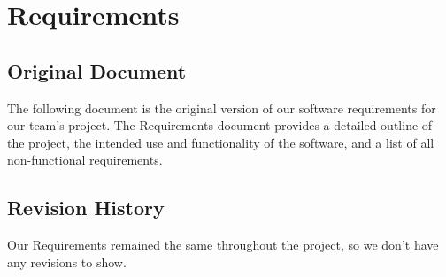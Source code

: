 \documentclass[10pt,letterpaper,onecolumn,draftclsnofoot,journal]{IEEEtran}
\begin{document}
\section{\textbf{Requirements}}
\subsection{\textbf{Original Document}}
The following document is the original version of our software requirements for our team's project. The Requirements document provides a detailed outline of the project, the intended use and functionality of the software, and a list of all non-functional requirements.     


\subsection{\textbf{Revision History}}
Our Requirements remained the same throughout the project, so we don't have any revisions to show.\vspace{.3cm}
\end{document}
